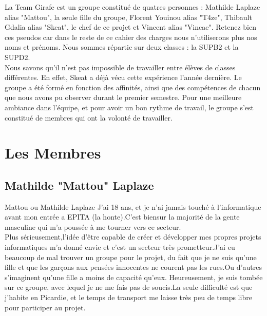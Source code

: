 \documentclass [11pt]{report}
\begin{document}
		La Team Girafe est  un groupe constitué de quatres personnes : Mathilde Laplaze alias "Mattou", la seule fille du groupe, Florent Youinou alias "T4ze", Thibault Gdalia alias "Skeat", le chef de ce projet et Vincent alias "Vincae". Retenez bien ces pseudos car dans le reste de ce cahier des charges nous n'utiliserons plus nos 		noms et pr\'enoms. Nous sommes r\'epartie sur deux classes : la SUPB2 et la SUPD2. \\
		\indent  Nous savons qu'il n'est pas impossible de travailler entre \'el\`eves de classes diff\'erentes. En effet, Skeat a déjà vécu cette expérience l'année dernière. Le groupe a \'et\'e form\'e en fonction des affinit\'es, ainsi que des comp\'etences de chacun que nous avons pu observer durant le premier semestre. 		Pour une meilleure ambiance dans l'\'equipe, et pour avoir un bon rythme de travail, le groupe s'est constitué de membres qui ont la volont\'e de travailler. 
	
	
	
	\newpage

	\section { Les Membres }
		\subsection {Mathilde "Mattou" Laplaze}
			Mattou ou Mathilde Laplaze J'ai 18 ans, et je n'ai jamais touché à l'informatique avant mon entrée a EPITA (la honte).C'est biensur la majorité de la gente masculine qui m'a poussée à me tourner vers ce secteur.\\
			\indent Plus sérieusement,l'idée d'être capable de créer et développer mes propres projets informatiques m'a donné envie et c'est un secteur très prometteur.J'ai eu beaucoup de mal trouver un groupe pour le projet, du fait que je ne suis qu'une fille et que les garçons aux pensées innocentes ne courent pas les rues.Ou 			d'autres s'imaginent qu'une fille a moins de capacité qu'eux. Heureusement, je suis tombée sur ce groupe, avec lequel je ne me fais pas de soucis.La seule difficulté est que j'habite en Picardie, et le temps de transport me laisse très peu de temps libre pour participer au projet.\\\vspace{10mm}
	
		
	
\end{document}
